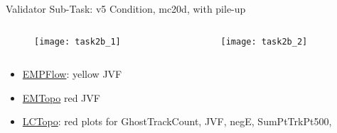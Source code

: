 \begin{frame}{Validator Sub-Task: v5 Condition, mc20d, with pile-up}
    \begin{columns}
        \begin{column}{0.5\textwidth}
            \begin{figure}
                \centering
                \texttt{[image: task2b\_1]}
            \end{figure}
        \end{column}
        \begin{column}{0.5\textwidth}
            \begin{figure}
                \centering
                \texttt{[image: task2b\_2]}
            \end{figure}
        \end{column}
    \end{columns}
        \begin{itemize}
        \item \href{https://atlas-computing.web.cern.ch/atlas-computing/links/PhysValDir/JetEtMiss/jet_21-07-08_task2b/AntiKt4EMPFlowJets/index.html}{EMPFlow}: yellow JVF
        \item \href{https://atlas-computing.web.cern.ch/atlas-computing/links/PhysValDir/JetEtMiss/jet_21-07-08_task2b/AntiKt4EMTopoJets/index.html}{EMTopo} red JVF
        \item \href{https://atlas-computing.web.cern.ch/atlas-computing/links/PhysValDir/JetEtMiss/jet_21-07-08_task2b/AntiKt4LCTopoJets/index.html}{LCTopo}: red plots for GhostTrackCount, JVF, negE, SumPtTrkPt500, 
    \end{itemize}
\end{frame}